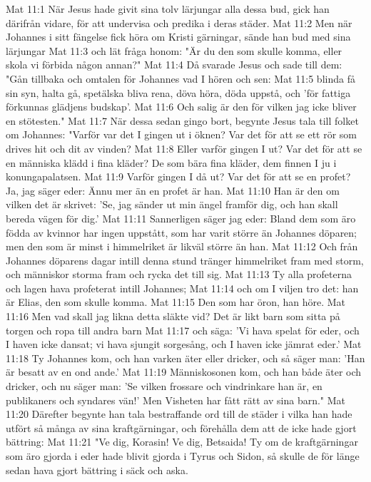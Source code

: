 Mat 11:1  När Jesus hade givit sina tolv lärjungar alla dessa bud, gick han därifrån vidare, för att undervisa och predika i deras städer.
Mat 11:2  Men när Johannes i sitt fängelse fick höra om Kristi gärningar, sände han bud med sina lärjungar
Mat 11:3  och lät fråga honom: "Är du den som skulle komma, eller skola vi förbida någon annan?"
Mat 11:4  Då svarade Jesus och sade till dem: "Gån tillbaka och omtalen för Johannes vad I hören och sen:
Mat 11:5  blinda få sin syn, halta gå, spetälska bliva rena, döva höra, döda uppstå, och 'för fattiga förkunnas glädjens budskap'.
Mat 11:6  Och salig är den för vilken jag icke bliver en stötesten."
Mat 11:7  När dessa sedan gingo bort, begynte Jesus tala till folket om Johannes: "Varför var det I gingen ut i öknen? Var det för att se ett rör som drives hit och dit av vinden?
Mat 11:8  Eller varför gingen I ut? Var det för att se en människa klädd i fina kläder? De som bära fina kläder, dem finnen I ju i konungapalatsen.
Mat 11:9  Varför gingen I då ut? Var det för att se en profet? Ja, jag säger eder: Ännu mer än en profet är han.
Mat 11:10  Han är den om vilken det är skrivet: 'Se, jag sänder ut min ängel framför dig, och han skall bereda vägen för dig.'
Mat 11:11  Sannerligen säger jag eder: Bland dem som äro födda av kvinnor har ingen uppstått, som har varit större än Johannes döparen; men den som är minst i himmelriket är likväl större än han.
Mat 11:12  Och från Johannes döparens dagar intill denna stund tränger himmelriket fram med storm, och människor storma fram och rycka det till sig.
Mat 11:13  Ty alla profeterna och lagen hava profeterat intill Johannes;
Mat 11:14  och om I viljen tro det: han är Elias, den som skulle komma.
Mat 11:15  Den som har öron, han höre.
Mat 11:16  Men vad skall jag likna detta släkte vid? Det är likt barn som sitta på torgen och ropa till andra barn
Mat 11:17  och säga: 'Vi hava spelat för eder, och I haven icke dansat; vi hava sjungit sorgesång, och I haven icke jämrat eder.'
Mat 11:18  Ty Johannes kom, och han varken äter eller dricker, och så säger man: 'Han är besatt av en ond ande.'
Mat 11:19  Människosonen kom, och han både äter och dricker, och nu säger man: 'Se vilken frossare och vindrinkare han är, en publikaners och syndares vän!' Men Visheten har fått rätt av sina barn."
Mat 11:20  Därefter begynte han tala bestraffande ord till de städer i vilka han hade utfört så många av sina kraftgärningar, och förehålla dem att de icke hade gjort bättring:
Mat 11:21  "Ve dig, Korasin! Ve dig, Betsaida! Ty om de kraftgärningar som äro gjorda i eder hade blivit gjorda i Tyrus och Sidon, så skulle de för länge sedan hava gjort bättring i säck och aska.
